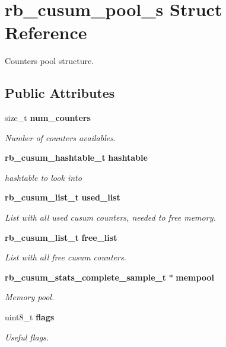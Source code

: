 \section{rb\+\_\+cusum\+\_\+pool\+\_\+s Struct Reference}
\label{structrb__cusum__pool__s}


Counters pool structure.  


\subsection*{Public Attributes}
\begin{DoxyCompactItemize}
\item 
size\+\_\+t {\bf num\+\_\+counters}
\begin{DoxyCompactList}\small\item\em Number of counters availables. \end{DoxyCompactList}\item 
{\bf rb\+\_\+cusum\+\_\+hashtable\+\_\+t} {\bf hashtable}
\begin{DoxyCompactList}\small\item\em hashtable to look into \end{DoxyCompactList}\item 
{\bf rb\+\_\+cusum\+\_\+list\+\_\+t} {\bf used\+\_\+list}
\begin{DoxyCompactList}\small\item\em List with all used cusum counters, needed to free memory. \end{DoxyCompactList}\item 
{\bf rb\+\_\+cusum\+\_\+list\+\_\+t} {\bf free\+\_\+list}
\begin{DoxyCompactList}\small\item\em List with all free cusum counters. \end{DoxyCompactList}\item 
{\bf rb\+\_\+cusum\+\_\+stats\+\_\+complete\+\_\+sample\+\_\+t} $\ast$ {\bf mempool}
\begin{DoxyCompactList}\small\item\em Memory pool. \end{DoxyCompactList}\item 
uint8\+\_\+t {\bf flags}
\begin{DoxyCompactList}\small\item\em Useful flags. \end{DoxyCompactList}\end{DoxyCompactItemize}


